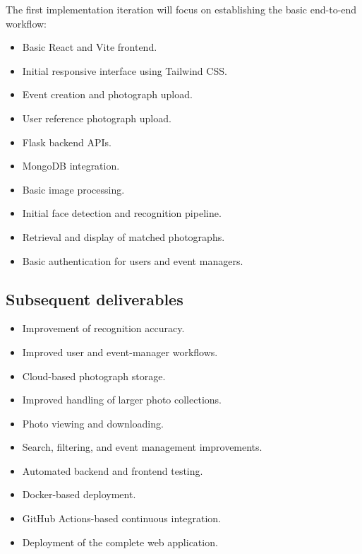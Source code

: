 \documentclass[11pt,a4paper]{article}
\begin{document}
The first implementation iteration will focus on establishing the
basic end-to-end workflow:

\begin{itemize}[leftmargin=0.7cm]

    \item Basic React and Vite frontend.

    \item Initial responsive interface using Tailwind CSS.

    \item Event creation and photograph upload.

    \item User reference photograph upload.

    \item Flask backend APIs.

    \item MongoDB integration.

    \item Basic image processing.

    \item Initial face detection and recognition pipeline.

    \item Retrieval and display of matched photographs.

    \item Basic authentication for users and event managers.

\end{itemize}

\subsection{Subsequent deliverables}

\begin{itemize}[leftmargin=0.7cm]

    \item Improvement of recognition accuracy.

    \item Improved user and event-manager workflows.

    \item Cloud-based photograph storage.

    \item Improved handling of larger photo collections.

    \item Photo viewing and downloading.

    \item Search, filtering, and event management improvements.

    \item Automated backend and frontend testing.

    \item Docker-based deployment.

    \item GitHub Actions-based continuous integration.

    \item Deployment of the complete web application.

\end{itemize}
\end{document}
